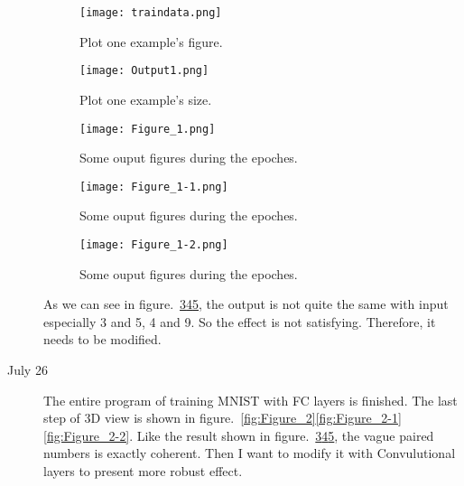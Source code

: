 \documentclass[a4paper]{article}
\begin{document}
\begin{description}
\begin{figure}[!htp]
	\begin{center}
		\texttt{[image: traindata.png]}
	\end{center}
	\caption{Plot one example's figure.}
	\label{fig:traindata}
\end{figure}

\begin{figure}[!htp]
	\begin{center}
		\texttt{[image: Output1.png]}
	\end{center}
	\caption{Plot one example's size.}
	\label{fig:Output1}
\end{figure}

\begin{figure}[!htp]
	\begin{center}
		\texttt{[image: Figure\_1.png]}
	\end{center}
	\caption{Some ouput figures during the epoches.}
	\label{fig:Figure_1}
\end{figure}

\begin{figure}[!htp]
	\begin{center}
		\texttt{[image: Figure\_1-1.png]}
	\end{center}
	\caption{Some ouput figures during the epoches.}
	\label{fig:Figure_1-1}
\end{figure}

\begin{figure}[!htp]
	\begin{center}
		\texttt{[image: Figure\_1-2.png]}
	\end{center}
	\caption{Some ouput figures during the epoches.}
	\label{fig:Figure_1-2}
\end{figure}

As we can see in figure.~\ref{fig:Figure_1}\ref{fig:Figure_1-1}\ref{fig:Figure_1-2}, the output is not quite the same with input especially 3 and 5, 4 and 9. So the effect is not satisfying. Therefore, it needs to be modified.\par
\item[July 26]\par
The entire program of training MNIST with FC layers is finished. The last step of 3D view is shown in figure.~\ref{fig:Figure_2}\ref{fig:Figure_2-1}\ref{fig:Figure_2-2}. Like the result shown in figure.~\ref*{fig:Figure_1}\ref{fig:Figure_1-1}\ref{fig:Figure_1-2}, the vague paired numbers is exactly coherent. Then I want to modify it with Convulutional layers to present more robust effect.


\end{description}
\end{document}
